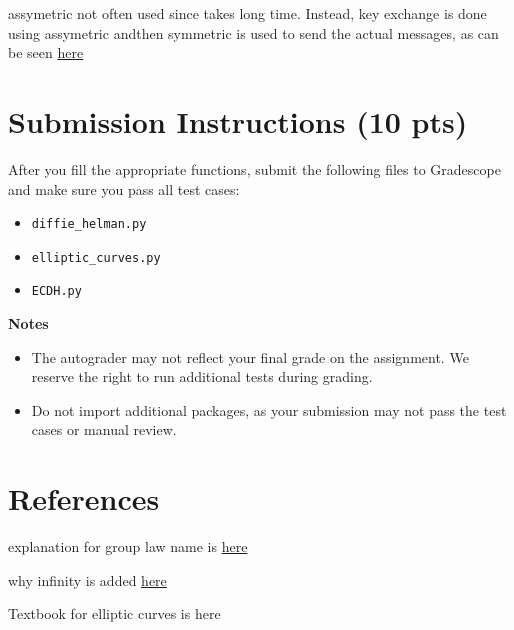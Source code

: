 \documentclass{article}
\begin{document}
    
    assymetric not often used since takes long time. Instead, key exchange is done using assymetric andthen symmetric is used to send the actual messages, as can be seen \href{https://github.com/nakov/Practical-Cryptography-for-Developers-Book/blob/master/asymmetric-key-ciphers/ecc-encryption-decryption.md}{here}


\section*{Submission Instructions (10 pts)}
    After you fill the appropriate functions, submit the following files to Gradescope and make sure you pass all test cases:
    \begin{itemize}
        \item \lstinline{diffie_helman.py}
        \item \lstinline{elliptic_curves.py}
        \item \lstinline{ECDH.py}
    \end{itemize}

    \vspace{3mm}
    \textbf{Notes}
    \begin{itemize}
        \item The autograder may not reflect your final grade on the assignment. We reserve the right to run additional tests during grading.
        \item Do not import additional packages, as your submission may not pass the test cases or manual review.
    \end{itemize}

    

\section*{References}


explanation for group law name is \href{https://www.math.brown.edu/reschwar/M1540B/elliptic.pdf}{here}


why infinity is added \href{https://crypto.stackexchange.com/questions/70507/in-elliptic-curve-what-does-the-point-at-infinity-look-like}{here}

Textbook for elliptic curves is here
\end{document}
